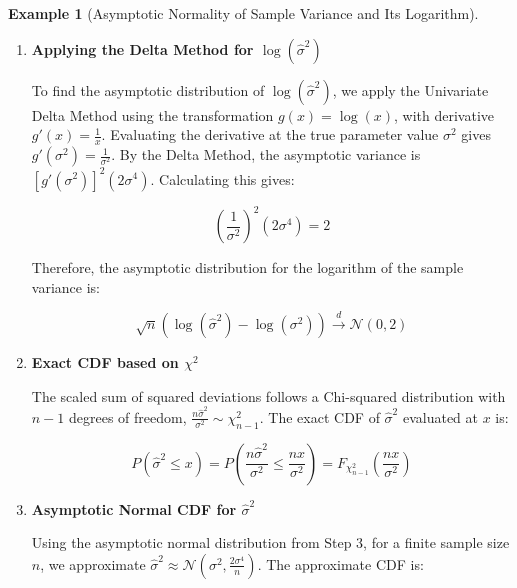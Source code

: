\documentclass[
  letterpaper,
  DIV=11,
  numbers=noendperiod]{scrreprt}
\renewcommand{\[}{\begin{equation}}
\renewcommand{\]}{\end{equation}}
\theoremstyle{definition}
\theoremstyle{plain}
\theoremstyle{plain}
\theoremstyle{plain}
\theoremstyle{definition}
\newtheorem{example}{Example}[chapter]
\theoremstyle{plain}
\theoremstyle{remark}
\begin{document}
\begin{example}[Asymptotic Normality of Sample Variance and Its
Logarithm]
\begin{enumerate}
  \[
  \sqrt{n}(\overline{W} - E[W_i]) = \sqrt{n}\left( \frac{1}{n}\sum_{i=1}^n (X_i - \mu)^2 - \sigma^2 \right) \xrightarrow{d} \mathcal{N}(0, 2\sigma^4)
  \]

  Consider the term \(\sqrt{n}(\overline{X} - \mu)^2\). We can rewrite
  this as:

  \[
  \underbrace{\sqrt{n}(\overline{X} - \mu)}_{\xrightarrow{d} \mathcal{N}(0, \sigma^2)} \cdot \underbrace{(\overline{X} - \mu)}_{\xrightarrow{p} 0 \text{ by WLLN}}
  \]

  By Slutsky's Theorem, the product converges in distribution to \(0\).
  Combining the terms, we establish the asymptotic distribution for the
  sample variance:

  \[
  \sqrt{n}(\hat{\sigma}^2 - \sigma^2) \xrightarrow{d} \mathcal{N}(0, 2\sigma^4)
  \]
\item
  \textbf{Applying the Delta Method for \(\log(\hat{\sigma}^2)\)}

  To find the asymptotic distribution of \(\log(\hat{\sigma}^2)\), we
  apply the Univariate Delta Method using the transformation
  \(g(x) = \log(x)\), with derivative \(g'(x) = \frac{1}{x}\).
  Evaluating the derivative at the true parameter value \(\sigma^2\)
  gives \(g'(\sigma^2) = \frac{1}{\sigma^2}\). By the Delta Method, the
  asymptotic variance is \([g'(\sigma^2)]^2 (2\sigma^4)\). Calculating
  this gives:

  \[
  \left(\frac{1}{\sigma^2}\right)^2 (2\sigma^4) = 2
  \]

  Therefore, the asymptotic distribution for the logarithm of the sample
  variance is:

  \[
  \sqrt{n}(\log(\hat{\sigma}^2) - \log(\sigma^2)) \xrightarrow{d} \mathcal{N}(0, 2)
  \]
\item
  \textbf{Exact CDF based on \(\chi^2\)}

  The scaled sum of squared deviations follows a Chi-squared
  distribution with \(n-1\) degrees of freedom,
  \(\frac{n\hat{\sigma}^2}{\sigma^2} \sim \chi^2_{n-1}\). The exact CDF
  of \(\hat{\sigma}^2\) evaluated at \(x\) is:

  \[
  P(\hat{\sigma}^2 \le x) = P\left(\frac{n\hat{\sigma}^2}{\sigma^2} \le \frac{nx}{\sigma^2}\right) = F_{\chi^2_{n-1}}\left(\frac{nx}{\sigma^2}\right)
  \]
\item
  \textbf{Asymptotic Normal CDF for \(\hat{\sigma}^2\)}

  Using the asymptotic normal distribution from Step 3, for a finite
  sample size \(n\), we approximate
  \(\hat{\sigma}^2 \approx \mathcal{N}(\sigma^2, \frac{2\sigma^4}{n})\).
  The approximate CDF is:


\end{enumerate}
\end{example}
\end{document}
